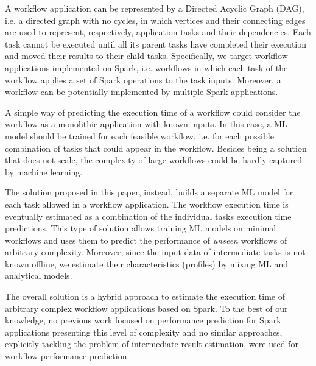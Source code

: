 \documentclass[a4paper, 10pt, conference]{ieeeconf}      %
\begin{document}
A workflow application can be  represented by a Directed Acyclic Graph (DAG), i.e. a directed graph with no cycles, in which vertices and their connecting edges are used to represent, respectively,  application tasks and their dependencies. Each task cannot be executed until all its parent tasks have completed their execution and moved their results to their child tasks. Specifically, we target workflow applications implemented on Spark, i.e. workflows in which each task of the workflow applies a set of Spark operations to the task inputs. Moreover, a workflow can be potentially implemented by multiple Spark applications.


A simple way of predicting the execution time of a workflow  could consider the workflow as a monolithic application with known inputs. In this case, a ML model should be trained for each feasible workflow, i.e. for each possible combination of tasks that could appear in the workflow. Besides being a solution that does not scale, the complexity of large workflows could be hardly captured by machine learning. 


The solution proposed in this paper, instead, builds a separate ML model for each task allowed in a workflow application. The workflow execution time is eventually estimated as a combination of the individual tasks execution time predictions. This type of solution allows training ML models on minimal workflows and uses them to predict the performance of \textit{unseen} workflows of arbitrary complexity.
Moreover, since the input data of intermediate tasks is not known offline, we estimate their characteristics (profiles) by mixing ML and analytical models.


The overall solution is a hybrid approach to estimate the execution time of arbitrary complex workflow applications based on Spark. To the best of our knowledge, no previous work focused on performance prediction for Spark applications presenting this level of complexity and no similar approaches, explicitly tackling the problem of intermediate result estimation, were used for workflow performance prediction.
\end{document}
